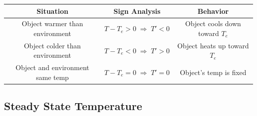 \documentclass[10pt,letterpaper]{article}
\begin{document}
\begin{center}
\renewcommand{\arraystretch}{1.4}
\begin{tabular}{|c|c|c|}
\hline
\textbf{Situation} & \textbf{Sign Analysis} & \textbf{Behavior} \\
\hline
Object warmer than environment 
& 
$T-T_e>0 \;\Rightarrow\; T'<0$ 
& 
Object cools down toward $T_e$ \\
\hline
Object colder than environment 
& 
$T-T_e<0 \;\Rightarrow\; T'>0$ 
& 
Object heats up toward $T_e$ \\
\hline
Object and environment same temp 
& 
$T-T_e=0 \;\Rightarrow\; T'=0$ 
& 
Object's temp is fixed \\
\hline
\end{tabular}
\end{center}

\subsection{Steady State Temperature}
\end{document}
